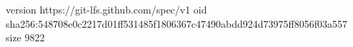version https://git-lfs.github.com/spec/v1
oid sha256:548708e0c2217d01ff531485f1806367c47490abdd924d73975ff8056f03a557
size 9822
